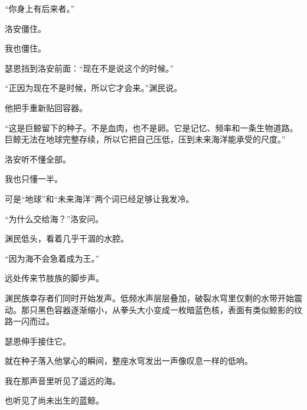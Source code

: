 “你身上有后来者。”

洛安僵住。

我也僵住。

瑟恩挡到洛安前面：“现在不是说这个的时候。”

“正因为现在不是时候，所以它才会来。”渊民说。

他把手重新贴回容器。

“这是巨鲸留下的种子。不是血肉，也不是卵。它是记忆、频率和一条生物道路。巨鲸无法在地球完整存续，所以它把自己压低，压到未来海洋能承受的尺度。”

洛安听不懂全部。

我也只懂一半。

可是“地球”和“未来海洋”两个词已经足够让我发冷。

“为什么交给海？”洛安问。

渊民低头，看着几乎干涸的水腔。

“因为海不会急着成为王。”

远处传来节肢族的脚步声。

渊民族幸存者们同时开始发声。低频水声层层叠加，破裂水穹里仅剩的水带开始震动。那只黑色容器逐渐缩小，从拳头大小变成一枚暗蓝色核，表面有类似鲸影的纹路一闪而过。

瑟恩伸手接住它。

就在种子落入他掌心的瞬间，整座水穹发出一声像叹息一样的低响。

我在那声音里听见了遥远的海。

也听见了尚未出生的蓝鲸。
